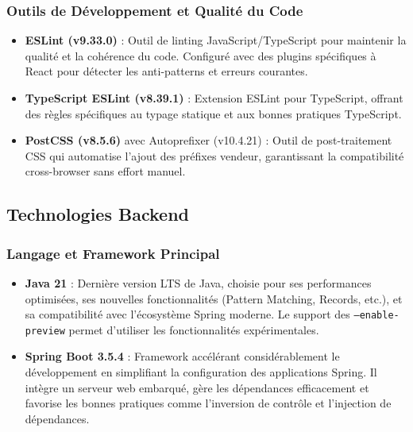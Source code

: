 \subsubsection{Outils de Développement et Qualité du Code}

\begin{itemize}
    \item \textbf{ESLint (v9.33.0)} : Outil de linting JavaScript/TypeScript pour maintenir la qualité et la cohérence du code. Configuré avec des plugins spécifiques à React pour détecter les anti-patterns et erreurs courantes.

    \item \textbf{TypeScript ESLint (v8.39.1)} : Extension ESLint pour TypeScript, offrant des règles spécifiques au typage statique et aux bonnes pratiques TypeScript.

    \item \textbf{PostCSS (v8.5.6)} avec Autoprefixer (v10.4.21) : Outil de post-traitement CSS qui automatise l'ajout des préfixes vendeur, garantissant la compatibilité cross-browser sans effort manuel.
\end{itemize}

\subsection{Technologies Backend}

\subsubsection{Langage et Framework Principal}

\begin{itemize}
    \item \textbf{Java 21} : Dernière version LTS de Java, choisie pour ses performances optimisées, ses nouvelles fonctionnalités (Pattern Matching, Records, etc.), et sa compatibilité avec l'écosystème Spring moderne. Le support des \texttt{--enable-preview} permet d'utiliser les fonctionnalités expérimentales.

    \item \textbf{Spring Boot 3.5.4} : Framework accélérant considérablement le développement en simplifiant la configuration des applications Spring. Il intègre un serveur web embarqué, gère les dépendances efficacement et favorise les bonnes pratiques comme l'inversion de contrôle et l'injection de dépendances.
\end{itemize}

